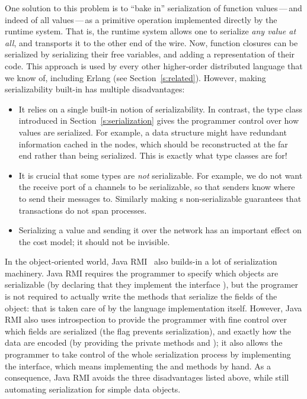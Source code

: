 \documentclass{sigplanconf}
\begin{document}
One solution to this problem is to ``bake in'' serialization of
function values\,---\,and indeed of all values\,---\,as a primitive operation
implemented directly by the runtime system.  That is, the runtime system
allows one to serialize \emph{any value at all}, and transports it to the 
other end of the wire. 
Now, function closures can be serialized by
serializing their free variables, and adding a representation of their code.
This approach is used by every other 
higher-order distributed language that we know of, including Erlang (see Section~\ref{s:related}).
However, making serializability built-in
has multiple disadvantages:
\begin{itemize}
\item It relies on a single built-in notion of serializability.
In contrast, the  type class introduced in 
Section~\ref{s:serialization} gives the programmer control over how
values are serialized.  For example, a data structure might have
redundant information cached in the nodes, which should be reconstructed
at the far end rather than being serialized.  
This is exactly what type
classes are for!
\item It is crucial that some types are \emph{not} serializable. For
example, we do not want the receive port of a channels to be serializable, 
so that senders know where to send their messages to.  Similarly making 
s non-serializable guarantees that  transactions 
do not span processes.
\item Serializing a value and sending it over the network has an important
effect on the cost model; it should not be invisible.
\end{itemize}
\noindent
In the object-oriented world, Java RMI~\cite{javarmi} also builds-in a lot of serialization machinery.  
Java RMI requires the programmer to specify which objects are serializable (by declaring that they implement the interface ), but the programer is not required to actually write the methods that serialize the fields of the object: that is taken care of by the language implementation itself.
However, Java RMI also uses introspection to provide the programmer with fine control over
which fields are serialized (the  flag prevents serialization), and exactly how the data are encoded (by providing the private methods  and ); it also allows the programmer to take control of the whole serialization process by implementing the  interface, which means implementing the  and  methods by hand. 
As a consequence, Java RMI avoids the three disadvantages listed above, while still automating serialization for simple data objects.
\end{document}
